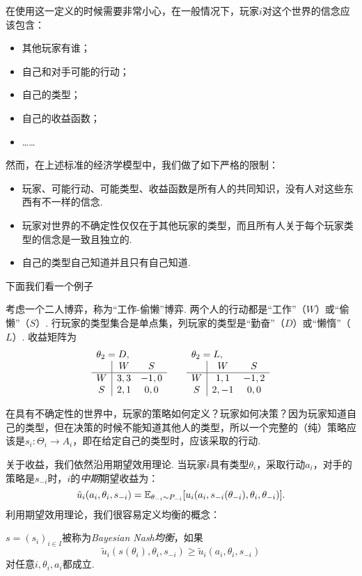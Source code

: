 在使用这一定义的时候需要非常小心，在一般情况下，玩家$i$对这个世界的信念应该包含：
\begin{itemize}
    \item 其他玩家有谁；
    \item 自己和对手可能的行动；
    \item 自己的类型；
    \item 自己的收益函数；
    \item ……
\end{itemize}
然而，在上述标准的经济学模型中，我们做了如下严格的限制：
\begin{itemize}
    \item 玩家、可能行动、可能类型、收益函数是所有人的共同知识，没有人对这些东西有不一样的信念. 
    \item 玩家对世界的不确定性仅仅在于其他玩家的类型，而且所有人关于每个玩家类型的信念是一致且独立的.
    \item 自己的类型自己知道并且只有自己知道.
\end{itemize} 

下面我们看一个例子


\begin{example}[合作者]
考虑一个二人博弈，称为“工作-偷懒”博弈. 两个人的行动都是“工作”（$W$）或“偷懒”（$S$）. 行玩家的类型集合是单点集，列玩家的类型是“勤奋”（$D$）或“懒惰”（$L$）. 收益矩阵为
\[\begin{array}{c|cc}
    \multicolumn{3}{l}{\theta_2=D,}\\
     &W&S  \\\hline
     W&3,3&-1,0\\
     S&2,1&0,0\\
\end{array}\qquad \begin{array}{c|cc}
    \multicolumn{3}{l}{\theta_2=L,}\\
     &W&S  \\\hline
     W&1,1&-1,2\\
     S&2,-1&0,0\\
\end{array}\]
\end{example}

在具有不确定性的世界中，玩家的策略如何定义？玩家如何决策？因为玩家知道自己的类型，但在决策的时候不能知道其他人的类型，所以一个完整的（纯）策略应该是$s_i:\Theta_i\to A_i$，即在给定自己的类型时，应该采取的行动.

关于收益，我们依然沿用期望效用理论. 当玩家$i$具有类型$\theta_i$，采取行动$a_i$，对手的策略是$s_{-i}$时，$i$的\emph{中期}期望收益为：
    \[\tilde u_i(a_i,\theta_i,s_{-i})=\mathbb{E}_{\theta_{-i}\sim P_{-i}}[u_i(a_i,s_{-i}(\theta_{-i}),\theta_i,\theta_{-i})].\]
利用期望效用理论，我们很容易定义均衡的概念：
\begin{definition}
$s=(s_i)_{i\in I}$被称为\emph{Bayesian Nash均衡}，如果
    \[\tilde u_i(s(\theta_i),\theta_i,s_{-i})\geq \tilde u_i(a_i,\theta_i,s_{-i})\]
对任意$i,\theta_i,a_i$都成立.
\end{definition}

